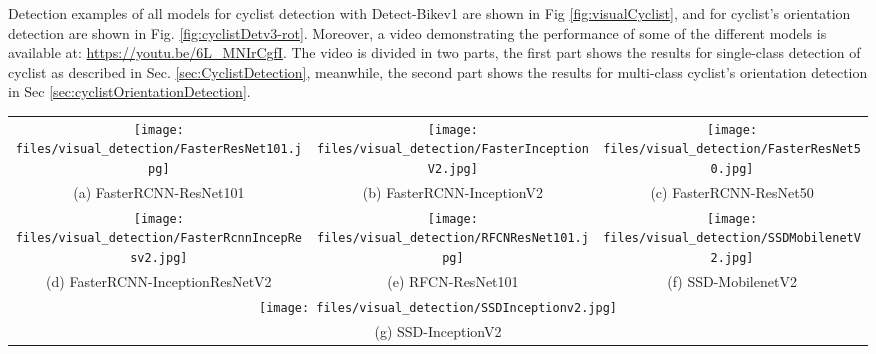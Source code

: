 \documentclass[journal]{IEEEtran}
\begin{document}
Detection examples of all models for cyclist detection with Detect-Bikev1 are shown in Fig \ref{fig:visualCyclist}, and for cyclist's orientation detection are shown in Fig. \ref{fig:cyclistDetv3-rot}. Moreover, a video demonstrating the performance of some of the different models is available at: \url{https://youtu.be/6L_MNIrCgfI}. The video is divided in two parts, the first part shows the results for single-class detection of cyclist as described in Sec. \ref{sec:CyclistDetection}, meanwhile, the second part shows the results for multi-class cyclist's orientation detection in Sec \ref{sec:cyclistOrientationDetection}. 
\begin{figure*}[ht!]
\begin{center}
\begin{tabular}{c c c}
\texttt{[image: files/visual\_detection/FasterResNet101.jpg]} & \texttt{[image: files/visual\_detection/FasterInceptionV2.jpg]} &
\texttt{[image: files/visual\_detection/FasterResNet50.jpg]} \\
(a) FasterRCNN-ResNet101 & (b) FasterRCNN-InceptionV2 & (c)  FasterRCNN-ResNet50 \\[6pt]
  \texttt{[image: files/visual\_detection/FasterRcnnIncepResv2.jpg]} & \texttt{[image: files/visual\_detection/RFCNResNet101.jpg]} & \texttt{[image: files/visual\_detection/SSDMobilenetV2.jpg]} \\
  (d) FasterRCNN-InceptionResNetV2 & (e) RFCN-ResNet101 & (f) SSD-MobilenetV2 \\[6pt]
\multicolumn{3}{c}{\texttt{[image: files/visual\_detection/SSDInceptionv2.jpg]} }\\
\multicolumn{3}{c}{(g) SSD-InceptionV2}
\end{tabular}
\caption{Multi-class orientation detection examples from seven different models: (a) Faster R-CNN with ResNet101, (b) Faster R-CNN with InceptionV2, (c) Faster R-CNN with ResNet50, (d) Faster R-CNN with InceptionResNetV2, (e) R-FCN with ResNet101, (f) SSD with MobilenetV2 and (g) SSD with InceptionV2. For each class a different colored bounding box is displayed. For this example, only Faster R-CNN with InceptionV2 and R-FCN with ResNet101 managed to detect all cyclists within the image. A problem that was identified is that similar classes such as CyclistNW and CyclistNE are hard to differentiate.
\label{fig:cyclistDetv3-rot}}
\end{center}
\end{figure*}
\end{document}

